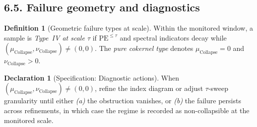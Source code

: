 \documentclass[11pt]{article}
\numberwithin{equation}{section}
\theoremstyle{plain}
\theoremstyle{definition}
\theoremstyle{remark}
\DeclareMathOperator{\Ext}{Ext}
\DeclareRobustCommand{\hyp}{\nobreakdash-}
\newcommand{\Rfun}{\mathcal{R}}
\theoremstyle{plain}
\theoremstyle{definition}
\numberwithin{equation}{section}
\theoremstyle{definition}
\newtheorem{definition}[theorem]{Definition}
\newtheorem{declaration}[theorem]{Declaration}
\DeclareRobustCommand{\FiltCh}[1]{\mathsf{FiltCh}(#1)}
\DeclareRobustCommand{\Ttau}{\texorpdfstring{\ensuremath{\mathbf{T}_{\tau}}}{T\_\tau}}
\DeclareRobustCommand{\Ctau}{\texorpdfstring{\ensuremath{C_{\tau}}}{C\_\tau}}
\DeclareRobustCommand{\muc}{\mu_{\mathrm{Collapse}}}
\DeclareRobustCommand{\nuc}{\nu_{\mathrm{Collapse}}}
\DeclareRobustCommand{\LC}{\texorpdfstring{\ensuremath{\mathrm{(LC)}}}{(LC)}}
\numberwithin{equation}{section}
\theoremstyle{plain}
\theoremstyle{definition}
\theoremstyle{remark}
\providecommand{\Cfun}[1]{\mathsf{C}_{#1}}
\providecommand{\Tfun}[1]{\mathbf{T}_{#1}}
\providecommand{\Ctau}{\Cfun{\tau}}
\providecommand{\Ttau}{\Tfun{\tau}}
\providecommand{\muc}{\mu_{\mathrm{Collapse}}}
\providecommand{\nuc}{\nu_{\mathrm{Collapse}}}
\providecommand{\n}{\unskip\space}
\begin{document}
\begin{center}
\end{center}

\subsection*{6.5. Failure geometry and diagnostics}
\begin{definition}[Geometric failure types at scale]\label{def:geom-failure}
Within the monitored window, a sample is \emph{Type~IV at scale \(\tau\)} if \(\mathrm{PE}^{\le\tau}\) and spectral indicators decay while \((\muc,\nuc)\neq(0,0)\).
The \emph{pure cokernel type} denotes \(\muc=0\) and \(\nuc>0\).
\end{definition}

\begin{declaration}[Specification: Diagnostic actions]\label{spec:diagnostic}
When \((\muc,\nuc)\neq(0,0)\), refine the index diagram or adjust \(\tau\)\hyp sweep granularity until either \emph{(a)} the obstruction vanishes, or \emph{(b)} the failure persists across refinements, in which case the regime is recorded as non\hyp collapsible at the monitored scale.
\end{declaration}
\end{document}

